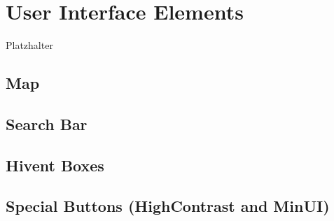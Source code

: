 \section{User Interface Elements}
Platzhalter\\
\subsection{Map}

\subsection{Search Bar}


\subsection{Hivent Boxes}
\subsection{Special Buttons (HighContrast and MinUI)}


\newpage